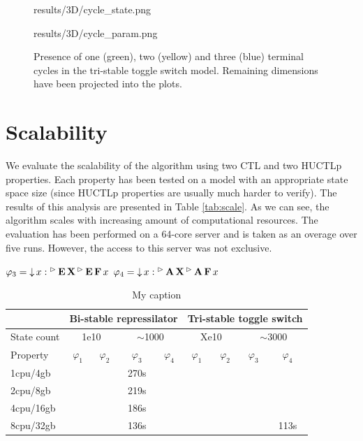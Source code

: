 \begin{figure}
	
	\begin{center}
		\begin{overpic}[width=.5\textwidth]{results/3D/cycle_state.png}\end{overpic}\hfill
		\begin{overpic}[width=.5\textwidth]{results/3D/cycle_param.png}\end{overpic}\hfill
	\end{center}
	
	\caption{Presence of one (green), two (yellow) and three (blue) terminal cycles in the tri-stable toggle switch model. Remaining dimensions have been projected into the plots.}
	\label{fig:triCycle}
\end{figure}

\section{Scalability}

We evaluate the scalability of the algorithm using two \ac{CTL} and two \ac{HUCTLp} properties. Each property has been tested on a model with an appropriate state space size (since \ac{HUCTLp} properties are usually much harder to verify). The results of this analysis are presented in Table \ref{tab:scale}. As we can see, the algorithm scales with increasing amount of computational resources. The evaluation has been performed on a 64-core server and is taken as an overage over five runs. However, the access to this server was not exclusive.

$\varphi_3 = \operatorname{\downarrow} x : {}^\vartriangleright\operatorname{\mathbf{E}}\operatorname{\mathbf{X}} {}^\vartriangleright\operatorname{\mathbf{E}}\operatorname{\mathbf{F}} x$
$\varphi_4 = \operatorname{\downarrow} x : {}^\vartriangleright\operatorname{\mathbf{A}}\operatorname{\mathbf{X}} {}^\vartriangleright\operatorname{\mathbf{A}}\operatorname{\mathbf{F}} x$

\begin{table}[]
	\centering
	\caption{My caption}
	\label{my-label}
	\begin{tabular}{l|cccc|cccc}
		& \multicolumn{4}{l|}{Bi-stable repressilator}         & \multicolumn{4}{l}{Tri-stable toggle switch}        \\ \hline
		State count & \multicolumn{2}{c}{1e10} & \multicolumn{2}{c|}{$\sim$1000} & \multicolumn{2}{c}{Xe10} & \multicolumn{2}{c}{$\sim3000$} \\ \hline
		Property    & $\varphi_1$ & $\varphi_2$ & $\varphi_3$ & $\varphi_4$ & $\varphi_1$ & $\varphi_2$ & $\varphi_3$ & $\varphi_4$  \\ \hline
		1cpu/4gb    &             &             & 270s &            &             &             &             &            \\
		2cpu/8gb    &             &             & 219s &            &             &             &             &            \\
		4cpu/16gb   &             &             & 186s &            &             &             &             &            \\
		8cpu/32gb   &             &             & 136s &            &             &             &             & 113s     
	\end{tabular}
\end{table}

